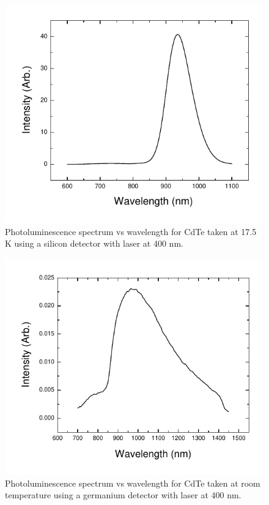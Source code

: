\documentclass[oneside]{BYUPhys}
\begin{document}
\begin{appendices}
\begin{figure}
    \centerline{\includegraphics{cdte-pl-lowtemp}}
    \caption[Photoluminesce spectrum for CdTe at 17.5 K]{\label{fig:CdTeLowTemp}
     Photoluminescence spectrum vs wavelength for CdTe taken at 17.5 K using a silicon detector with laser at 400 nm.}
 \end{figure}

\begin{figure}
    \centerline{\includegraphics{cdte-pl-hightemp}}
    \caption[Photoluminesce spectrum for CdTe at room temperature]{\label{fig:CdTeHighTemp}
     Photoluminescence spectrum vs wavelength for CdTe taken at room temperature using a germanium detector with laser at 400 nm.}
 \end{figure}

\end{appendices}




\printindex
\end{document}
